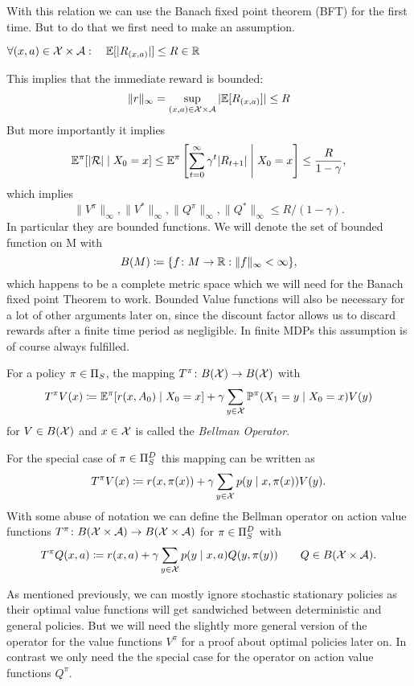 With this relation we can use the Banach fixed point theorem (BFT) for the first time. But to do that we first need to make an assumption.
\begin{assumption} \label{assumption boundedness}
	\(\forall (x,a)\in\mathcal{X}\times\mathcal{A}:\quad\mathbb{E}[|R_{(x,a)}|]\le R\in\mathbb{R}\)
\end{assumption}
This implies that the immediate reward is bounded:
\[
	\|r\|_{\infty}=\sup_{(x,a)\in\mathcal{X}\times\mathcal{A}}|\mathbb{E}[R_{(x,a)}]|\le R
\]
But more importantly it implies
\[
	\mathbb{E}^\pi[|\mathcal{R}| \mid X_0 = x]\le\mathbb{E}^\pi\left[\sum_{t=0}^\infty \gamma^t |R_{t+1}| \;\middle|\; X_0=x \right]
	\le \frac{R}{1-\gamma},
\]
which implies 
\[
	\|V^\pi\|_\infty,\|V^*\|_\infty, \|Q^\pi\|_\infty,\|Q^*\|_\infty \le R/(1-\gamma).
\]
In particular they are bounded functions. We will denote the set of bounded function on M with 
\[
	B(M)\coloneqq \{f\colon M\to\mathbb{R} : \|f\|_\infty <\infty \},
\]
which happens to be a complete metric space which we will need for the Banach fixed point Theorem to work. Bounded Value functions will also be necessary for a lot of other arguments later on, since the discount factor allows us to discard rewards after a finite time period as negligible.  In finite MDPs this assumption is of course always fulfilled. 


\begin{definition}
	For a policy \(\pi\in\Pi_S\), the mapping \(T^\pi\colon B(\mathcal{X})\to B(\mathcal{X})\) with
	\[
		T^\pi V(x)\coloneqq \mathbb{E}^\pi[r(x,A_0)\mid X_0=x] 
		+ \gamma \sum_{y\in\mathcal{X}} \mathbb{P}^\pi(X_1=y\mid X_0=x) V(y)
	\]
	for \(V\in B(\mathcal{X})\) and \(x\in\mathcal{X}\) is called the \emph{Bellman Operator}.

	For the special case of \(\pi\in\Pi_S^D\) this mapping can be written as
	\[
		T^\pi V(x)\coloneqq r(x,\pi(x))+\gamma\sum_{y\in\mathcal{X}}p(y\mid x,\pi(x)) V(y).
	\]
	With some abuse of notation we can define the Bellman operator on action value functions \(T^\pi\colon B(\mathcal{X}\times\mathcal{A})\to B(\mathcal{X}\times\mathcal{A})\) for \(\pi\in\Pi_S^D\) with
	\[
		T^\pi Q(x,a)\coloneqq r(x,a)
		+\gamma\sum_{y\in\mathcal{X}}p(y\mid x,a) Q(y,\pi(y)) 
		\qquad Q\in B(\mathcal{X}\times\mathcal{A}).
	\]	
\end{definition}
As mentioned previously, we can mostly ignore stochastic stationary policies as their optimal value functions will get sandwiched between deterministic and general policies. But we will need the slightly more general version of the operator for the value functions \(V^\pi\) for a proof about optimal policies later on. In contrast we only need the the special case for the operator on action value functions \(Q^\pi\).

